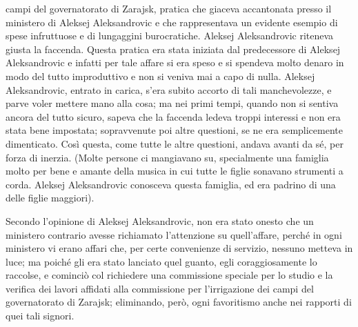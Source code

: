 campi del governatorato di Zarajsk, pratica che giaceva accantonata presso il ministero di Aleksej Aleksandrovic e che rappresentava un evidente esempio di spese infruttuose e di lungaggini burocratiche. Aleksej Aleksandrovic riteneva giusta la faccenda. Questa pratica era stata iniziata dal predecessore di Aleksej Aleksandrovic e infatti per tale affare si era speso e si spendeva molto denaro in modo del tutto improduttivo e non si veniva mai a capo di nulla. Aleksej Aleksandrovic, entrato in carica, s'era subito accorto di tali manchevolezze, e parve voler mettere mano alla cosa; ma nei primi tempi, quando non si sentiva ancora del tutto sicuro, sapeva che la faccenda ledeva troppi interessi e non era stata bene impostata; sopravvenute poi altre questioni, se ne era semplicemente dimenticato. Così questa, come tutte le altre questioni, andava avanti da sé, per forza di inerzia. (Molte persone ci mangiavano su, specialmente una famiglia molto per bene e amante della musica in cui tutte le figlie sonavano strumenti a corda. Aleksej Aleksandrovic conosceva questa famiglia, ed era padrino di una delle figlie maggiori). 

Secondo l'opinione di Aleksej Aleksandrovic, non era stato onesto che un ministero contrario avesse richiamato l'attenzione su quell'affare, perché in ogni ministero vi erano affari che, per certe convenienze di servizio, nessuno metteva in luce; ma poiché gli era stato lanciato quel guanto, egli coraggiosamente lo raccolse, e cominciò col richiedere una commissione speciale per lo studio e la verifica dei lavori affidati alla commissione per l'irrigazione dei campi del governatorato di Zarajsk; eliminando, però, ogni favoritismo anche nei rapporti di quei tali signori. 

